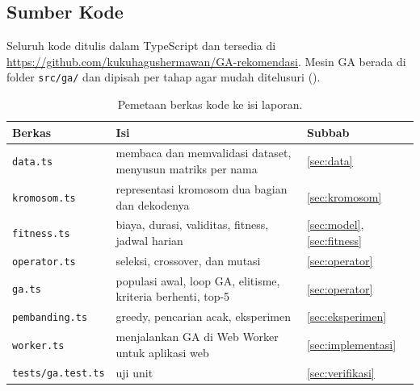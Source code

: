 \subsection{Sumber Kode}

Seluruh kode ditulis dalam TypeScript dan tersedia di \url{https://github.com/kukuhagushermawan/GA-rekomendasi}. Mesin GA berada di folder \texttt{src/ga/} dan dipisah per tahap agar mudah ditelusuri ().

\begin{table}[H]
\centering
\caption{Pemetaan berkas kode ke isi laporan.}
\label{tab:kode}
\small
\begin{tabular}{@{}l >{\raggedright\arraybackslash}p{8.4cm} l@{}}
\toprule
\textbf{Berkas} & \textbf{Isi} & \textbf{Subbab} \\
\midrule
\texttt{data.ts}       & membaca dan memvalidasi dataset, menyusun matriks per nama & \ref{sec:data} \\
\texttt{kromosom.ts}   & representasi kromosom dua bagian dan dekodenya & \ref{sec:kromosom} \\
\texttt{fitness.ts}    & biaya, durasi, validitas, fitness, jadwal harian & \ref{sec:model}, \ref{sec:fitness} \\
\texttt{operator.ts}   & seleksi, crossover, dan mutasi & \ref{sec:operator} \\
\texttt{ga.ts}         & populasi awal, loop GA, elitisme, kriteria berhenti, top-5 & \ref{sec:operator} \\
\texttt{pembanding.ts} & greedy, pencarian acak, eksperimen & \ref{sec:eksperimen} \\
\texttt{worker.ts}     & menjalankan GA di Web Worker untuk aplikasi web & \ref{sec:implementasi} \\
\texttt{tests/ga.test.ts} & 37 uji unit & \ref{sec:verifikasi} \\
\bottomrule
\end{tabular}
\end{table}
